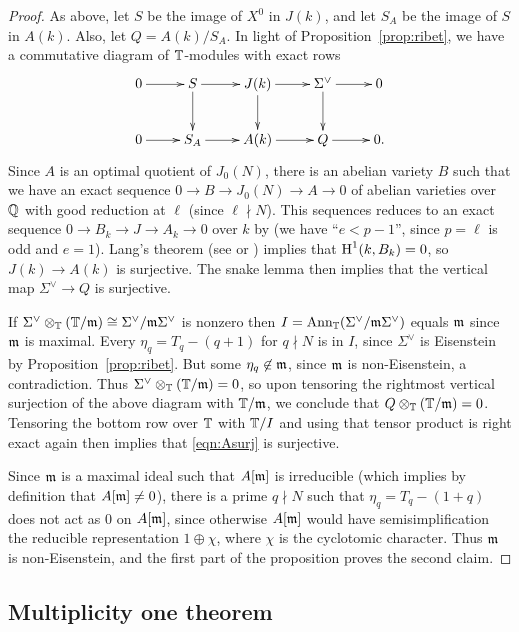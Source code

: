 \documentclass{article} \usepackage[active]{srcltx}
\begin{document}
\begin{proof}
As above, let $S$ be the image of $X^0$ in $J(k)$, and
let $S_A$ be the image of $S$ in $A(k)$. Also, 
let $Q = A(k)/S_A$.
In light of Proposition~\ref{prop:ribet}, 
we have a commutative diagram of $\mathbb{T}$-modules with exact rows
$$
\xymatrix{
0\ar[r]& S \ar[r]\ar[d] & J(k) \ar[r]\ar[d] & \Sigma^{\vee} \ar[r]\ar[d] & 0 \\
0\ar[r]& S_A \ar[r] & A(k) \ar[r] & Q \ar[r]& 0.
}
$$
Since $A$ is an optimal quotient of $J_0(N)$, there is
an abelian variety $B$ such that we have an exact
sequence $0 \to B \to J_0(N) \to A \to 0$ of abelian varieties over
$\mathbb{Q}$ with good reduction at $\ell$ (since $\ell\nmid N$). This
sequences reduces to an exact sequence $0 \to B_{k} \to J \to A_k \to
0$ over $k$ by \cite[\S7.5, Thm.~4]{neronmodels} (we have ``$e<p-1$'',
since $p=\ell$ is odd and $e=1$).  Lang's theorem (see
\cite{lang:finitefields} or \cite[\S{}VI.4]{serre:alggroups}) implies
that $\operatorname{H}^1(k,B_k)=0$, so $J(k)\to A(k)$ is surjective.  The snake
lemma then implies that the vertical map $\Sigma^{\vee} \to Q$ is
surjective. 

If $\Sigma^{\vee} \otimes_{\mathbb{T}} (\mathbb{T}/\mathfrak{m}) \cong \Sigma^{\vee} /
\mathfrak{m}\Sigma^{\vee}$ is nonzero then $I = \operatorname{Ann}_{\mathbb{T}}(\Sigma^{\vee} /
\mathfrak{m}\Sigma^{\vee})$ equals $\mathfrak{m}$ since $\mathfrak{m}$ is maximal.  Every $\eta_q =
T_{q} - (q+1)$ for $q\nmid N$ is in $I$, since $\Sigma^{\vee}$ is
Eisenstein by Proposition~\ref{prop:ribet}.  But some $\eta_q \not \in
\mathfrak{m}$, since $\mathfrak{m}$ is non-Eisenstein, a contradiction.  Thus
$\Sigma^{\vee} \otimes_{\mathbb{T}} (\mathbb{T}/\mathfrak{m})=0$, so upon tensoring the
rightmost vertical surjection of the above diagram with $\mathbb{T}/\mathfrak{m}$, we
conclude that $Q\otimes_{\mathbb{T}} (\mathbb{T}/\mathfrak{m})=0$.  Tensoring the bottom row
over $\mathbb{T}$ with $\mathbb{T}/I$ and using that tensor product is right exact
again then implies that \eqref{eqn:Asurj} is surjective.

Since $\mathfrak{m}$ is a maximal ideal such that $A[\mathfrak{m}]$ is irreducible (which
implies by definition that $A[\mathfrak{m}]\neq 0$), there is a prime
$q\nmid N$ such that $\eta_q = T_q-(1+q)$ does not act as $0$ on
$A[\mathfrak{m}]$, since otherwise $A[\mathfrak{m}]$ would have semisimplification the
reducible representation $1\oplus \chi$, where $\chi$ is the
cyclotomic character.  Thus $\mathfrak{m}$ is non-Eisenstein, and the first
part of the proposition proves the second claim.  
\end{proof}


\subsection{Multiplicity one theorem}\label{sec:multone}
\end{document}
